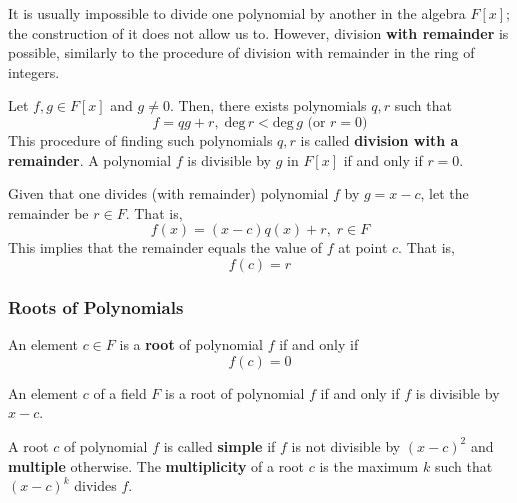 \documentclass{article}
\begin{document}
      It is usually impossible to divide one polynomial by another in the algebra $F[x]$; the construction of it does not allow us to. However, division \textbf{with remainder} is possible, similarly to the procedure of division with remainder in the ring of integers. 

      \begin{theorem}
        Let $f, g \in F[x]$ and $g \neq 0$. Then, there exists polynomials $q, r$ such that 
        \begin{equation}
          f = q g + r, \; \text{deg}\, r < \text{deg}\, g \text{ (or } r = 0 \text{)}
        \end{equation}
        This procedure of finding such polynomials $q, r$ is called \textbf{division with a remainder}. A polynomial $f$ is divisible by $g$ in $F[x]$ if and only if $r = 0$. 
      \end{theorem}

      \begin{theorem}
        Given that one divides (with remainder) polynomial $f$ by $g = x - c$, let the remainder be $r \in F$. That is, 
        \begin{equation}
          f(x) = (x-c) q(x) + r, \; r \in F
        \end{equation}
        This implies that the remainder equals the value of $f$ at point $c$. That is, 
        \begin{equation}
          f(c) = r
        \end{equation}
      \end{theorem}

    \subsubsection{Roots of Polynomials}

      \begin{definition}
        An element $c \in F$ is a \textbf{root} of polynomial $f$ if and only if 
        \begin{equation}
          f(c) = 0
        \end{equation}
      \end{definition}

      \begin{corollary}
        An element $c$ of a field $F$ is a root of polynomial $f$ if and only if $f$ is divisible by $x - c$. 
      \end{corollary}

      \begin{definition}
        A root $c$ of polynomial $f$ is called \textbf{simple} if $f$ is not divisible by $(x-c)^2$ and \textbf{multiple} otherwise. The \textbf{multiplicity} of a root $c$ is the maximum $k$ such that $(x-c)^k$ divides $f$. 
      \end{definition}
\end{document}
